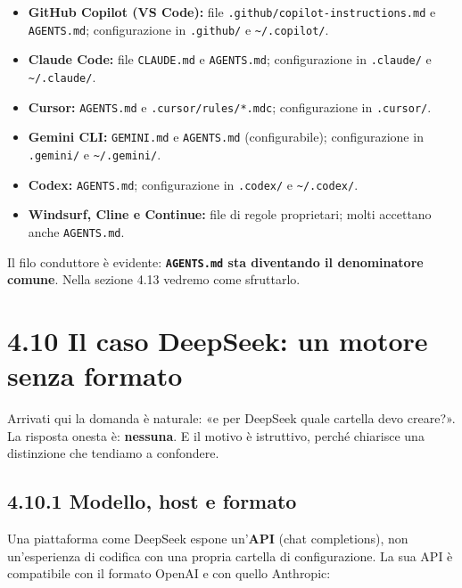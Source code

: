 \documentclass[
  italian,
  10pt,
]{book}
\providecommand{\tightlist}{%
  \setlength{\itemsep}{0pt}\setlength{\parskip}{0pt}}
\begin{document}
\begin{itemize}
\tightlist
\item
  \textbf{GitHub Copilot (VS Code):} file
  \texttt{.github/copilot-instructions.md} e \texttt{AGENTS.md};
  configurazione in \texttt{.github/} e
  \texttt{\textasciitilde{}/.copilot/}.
\item
  \textbf{Claude Code:} file \texttt{CLAUDE.md} e \texttt{AGENTS.md};
  configurazione in \texttt{.claude/} e
  \texttt{\textasciitilde{}/.claude/}.
\item
  \textbf{Cursor:} \texttt{AGENTS.md} e \texttt{.cursor/rules/*.mdc};
  configurazione in \texttt{.cursor/}.
\item
  \textbf{Gemini CLI:} \texttt{GEMINI.md} e \texttt{AGENTS.md}
  (configurabile); configurazione in \texttt{.gemini/} e
  \texttt{\textasciitilde{}/.gemini/}.
\item
  \textbf{Codex:} \texttt{AGENTS.md}; configurazione in \texttt{.codex/}
  e \texttt{\textasciitilde{}/.codex/}.
\item
  \textbf{Windsurf, Cline e Continue:} file di regole proprietari; molti
  accettano anche \texttt{AGENTS.md}.
\end{itemize}

Il filo conduttore è evidente: \textbf{\texttt{AGENTS.md} sta diventando
il denominatore comune}. Nella sezione 4.13 vedremo come sfruttarlo.

\section{4.10 Il caso DeepSeek: un motore senza
formato}\label{il-caso-deepseek-un-motore-senza-formato}

Arrivati qui la domanda è naturale: «e per DeepSeek quale cartella devo
creare?». La risposta onesta è: \textbf{nessuna}. E il motivo è
istruttivo, perché chiarisce una distinzione che tendiamo a confondere.

\subsection{4.10.1 Modello, host e
formato}\label{modello-host-e-formato}

Una piattaforma come DeepSeek espone un'\textbf{API} (chat completions),
non un'esperienza di codifica con una propria cartella di
configurazione. La sua API è compatibile con il formato OpenAI e con
quello Anthropic:
\end{document}
